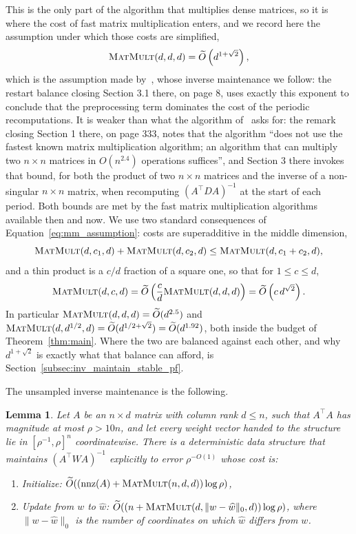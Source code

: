 \documentclass[11pt]{article}
\newtheorem{lemma}{Lemma}[section]
\newcommand{\nnz}{\operatorname{nnz}}
\newcommand{\MM}{\textsc{MatMult}}
\renewcommand{\O}{\widetilde O}
\newcommand{\what}{\widehat{w}}
\begin{document}
This is the only part of the algorithm that multiplies dense matrices, so it is
where the cost of fast matrix multiplication enters, and we record here the
assumption under which those costs are simplified,
\begin{equation}
\label{eq:mm_assumption}
\MM(d, d, d) = \O\left( d^{1 + \sqrt{2}} \right) ,
\end{equation}
which is the assumption made by~\cite{LS15}, whose inverse
maintenance we follow: the restart balance closing Section 3.1 there, on page 8,
uses exactly this exponent to conclude that the preprocessing term dominates the
cost of the periodic recomputations.
It is weaker than what the algorithm of~\cite{V89} asks for: the remark
closing Section 1 there, on page 333, notes that the algorithm ``does not use
the fastest known matrix multiplication algorithm; an algorithm that can
multiply two $n \times n$ matrices in
$O(n^{2.4})$ operations suffices'', and Section 3 there invokes that bound, for
both the product of two $n \times n$ matrices and the inverse of a non-singular
$n \times n$ matrix, when recomputing
$(A^\top D A)^{-1}$ at the start of each period.
Both bounds are met by the fast matrix multiplication algorithms available then
and now.
We use two standard consequences of Equation~\eqref{eq:mm_assumption}: costs are
superadditive in the middle dimension,
\[
\MM(d, c_1, d) + \MM(d, c_2, d)
\le
\MM(d, c_1 + c_2, d) ,
\]
and a thin product is a $c / d$ fraction of a square one, so that for
$1 \le c \le d$,
\[
\MM(d, c, d)
=
\O\left( \frac{c}{d} \MM(d, d, d) \right)
=
\O\left( c \, d^{\sqrt{2}} \right) .
\]
In particular $\MM(d, d, d) = \O(d^{2.5})$ and
$\MM(d, d^{1/2}, d) = \O(d^{1/2 + \sqrt{2}}) = \O(d^{1.92})$, both inside the
budget of Theorem~\ref{thm:main}.
Where the two are balanced against each other, and why $d^{1 + \sqrt{2}}$ is
exactly what that balance can afford, is
Section~\ref{subsec:inv_maintain_stable_pf}.

The unsampled inverse maintenance is the following.

\begin{lemma}
\label{lem:inv_maintain_explicit}
Let $A$ be an
$n \times d$ matrix with column rank
$d \leq n$, such that
$A^\top A$ has magnitude at most
$\rho > 10n$, and let every weight vector handed to the structure lie in
$[\rho^{-1}, \rho]^{n}$ coordinatewise.
There is a deterministic data structure that maintains $(A^{\top} W A)^{-1}$
explicitly to error $\rho^{-O(1)}$ whose cost is:
\begin{enumerate}
\item \label{itm:inv_maintain_explicit:1} Initialize:
  $\O( ( \nnz(A) + \MM(n, d, d)) \log\rho)$,
\item \label{itm:inv_maintain_explicit:2} Update from $w$ to
  $\what$:
  $\O( ( n + \MM(d, \|w - \what\|_{0}, d) ) \log\rho )$, where
  $\|w - \what\|_{0}$ is the number of coordinates on which
  $\what$ differs from
  $w$.
\end{enumerate}
\end{lemma}
\end{document}
